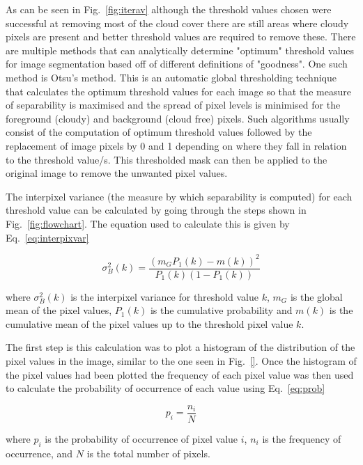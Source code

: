 As can be seen in Fig.~\ref{fig:iterav} although the threshold values chosen were successful at removing most of the cloud cover there are still areas where cloudy pixels are present and better threshold values are required to remove these. There are multiple methods that can analytically determine "optimum" threshold values for image segmentation based off of different definitions of "goodness". One such method is Otsu's method. This is an automatic global thresholding technique that calculates the optimum threshold values for each image so that the measure of separability is maximised and the spread of pixel levels is minimised for the foreground (cloudy) and background (cloud free) pixels. Such algorithms usually consist of the computation of optimum threshold values followed by the replacement of image pixels by 0 and 1 depending on where they fall in relation to the threshold value/s. This thresholded mask can then be applied to the original image to remove the unwanted pixel values.

\par
The interpixel variance (the measure by which separability is computed) for each threshold value can be calculated by going through the steps shown in Fig.~\ref{fig:flowchart}. The equation used to calculate this is given by Eq.~\ref{eq:interpixvar}

\begin{equation}\label{eq:interpixvar}
\sigma_{B}^{2}(k)=\frac{\left(m_{G} P_{1}(k)-m(k)\right)^{2}}{P_{1}(k)\left(1-P_{1}(k)\right)}
\end{equation}


where $\sigma_{B}^{2}(k)$ is the interpixel variance for threshold value $k$, $m_G$ is the global mean of the pixel values, $P_{1}(k)$ is the cumulative probability and $m(k)$ is the cumulative mean of the pixel values up to the threshold pixel value $k$.

\par
The first step is this calculation was to plot a histogram of the distribution of the pixel values in the image, similar to the one seen in Fig.~\ref{}. Once the histogram of the pixel values had been plotted the frequency of each pixel value was then used to calculate the probability of occurrence of each value using Eq.~\ref{eq:prob}

\begin{equation}\label{eq:prob}
p_{i}=\frac{n_{i}}{N}
\end{equation}


where $p_{i}$ is the probability of occurrence of pixel value $i$, $n_{i}$ is the frequency of occurrence, and $N$ is the total number of pixels.

